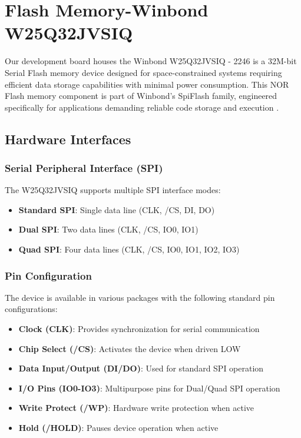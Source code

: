 %
%

\chapter{Flash Memory-Winbond W25Q32JVSIQ}

Our development board houses the Winbond W25Q32JVSIQ - 2246 is a 32M-bit Serial Flash memory device designed for space-constrained systems requiring efficient data storage capabilities with minimal power consumption. This NOR Flash memory component is part of Winbond's SpiFlash family, engineered specifically for applications demanding reliable code storage and execution \cite{Winbond:2016}.


\section{Hardware Interfaces}

\subsection{Serial Peripheral Interface (SPI)}
The W25Q32JVSIQ supports multiple SPI interface modes:
\begin{itemize}
	\item \textbf{Standard SPI}: Single data line (CLK, /CS, DI, DO)
	\item \textbf{Dual SPI}: Two data lines (CLK, /CS, IO0, IO1)
	\item \textbf{Quad SPI}: Four data lines (CLK, /CS, IO0, IO1, IO2, IO3) \cite{Winbond:2016}
\end{itemize}

\subsection{Pin Configuration}
The device is available in various packages with the following standard pin configurations:
\begin{itemize}
	\item \textbf{Clock (CLK)}: Provides synchronization for serial communication
	\item \textbf{Chip Select (/CS)}: Activates the device when driven LOW
	\item \textbf{Data Input/Output (DI/DO)}: Used for standard SPI operation
	\item \textbf{I/O Pins (IO0-IO3)}: Multipurpose pins for Dual/Quad SPI operation
	\item \textbf{Write Protect (/WP)}: Hardware write protection when active
	\item \textbf{Hold (/HOLD)}: Pauses device operation when active \cite{Winbond:2016}
\end{itemize}

